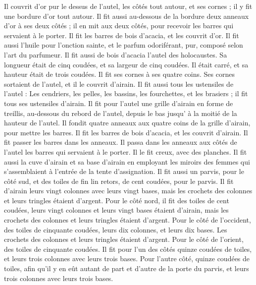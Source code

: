 \begin{multicols}{2}
Il couvrit d’or pur le dessus de l'autel, les côtés tout autour, et ses cornes ; il y fit une bordure d’or tout autour.
Il fit aussi au-dessous de la bordure deux anneaux d'or à ses deux côtés ; il en mit aux deux côtés, pour recevoir les barres qui servaient à le porter.
Il fit les barres de bois d’acacia, et les couvrit d'or.
Il fit aussi l'huile pour l'onction sainte, et le parfum odoriférant, pur, composé selon l’art du parfumeur.
\VerseOne{}Il fit aussi de bois d’acacia l'autel des holocaustes. Sa longueur était de cinq coudées, et sa largeur de cinq coudées. Il était carré, et sa hauteur était de trois coudées.
Il fit ses cornes à ses quatre coins. Ses cornes sortaient de l’autel, et il le couvrit d'airain.
Il fit aussi tous les ustensiles de l'autel : Les cendriers, les pelles, les bassins, les fourchettes, et les brasiers ; il fit tous ses ustensiles d'airain.
Il fit pour l'autel une grille d'airain en forme de treillis, au-dessous du rebord de l'autel, depuis le bas jusqu’ à la moitié de la hauteur de l’autel.
Il fondit quatre anneaux aux quatre coins de la grille d'airain, pour mettre les barres.
Il fit les barres de bois d’acacia, et les couvrit d'airain.
Il fit passer les barres dans les anneaux. Il passa dans les anneaux aux côtés de l’autel les barres qui servaient à le porter. Il le fit creux, avec des planches.
Il fit aussi la cuve d'airain et sa base d'airain en employant les miroirs des femmes qui s’assemblaient à l’entrée de la tente d'assignation.
Il fit aussi un parvis, pour le côté sud, et des toiles de fin lin retors, de cent coudées, pour le parvis.
Il fit d'airain leurs vingt colonnes avec leurs vingt bases, mais les crochets des colonnes et leurs tringles étaient d'argent.
Pour le côté nord, il fit des toiles de cent coudées, leurs vingt colonnes et leurs vingt bases étaient d'airain, mais les crochets des colonnes et leurs tringles étaient d'argent.
Pour le côté de l'occident, des toiles de cinquante coudées, leurs dix colonnes, et leurs dix bases. Les crochets des colonnes et leurs tringles étaient d'argent.
Pour le côté de l'orient, des toiles de cinquante coudées.
Il fit pour l'un des côtés quinze coudées de toiles, et leurs trois colonnes avec leurs trois bases.
Pour l'autre côté, quinze coudées de toiles, afin qu'il y en eût autant de part et d’autre de la porte du parvis, et leurs trois colonnes avec leurs trois bases.

\end{multicols}
